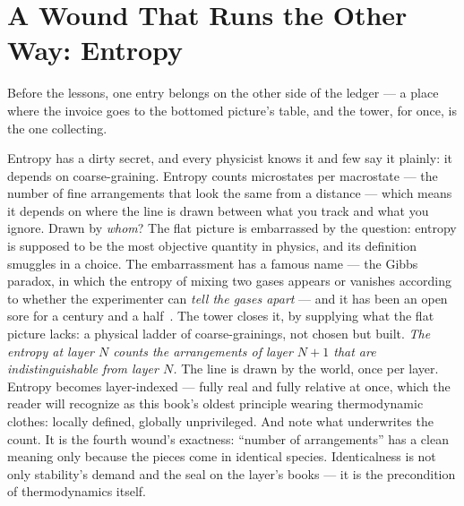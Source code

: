 \documentclass[fontsize=11pt,paper=a4,pagesize=auto,parskip=half-]{scrbook}
\begin{document}
\section{A Wound That Runs the Other Way: Entropy}

Before the lessons, one entry belongs on the other side of the ledger --- a place where the invoice goes to the bottomed picture's table, and the tower, for once, is the one collecting.

Entropy has a dirty secret, and every physicist knows it and few say it plainly: it depends on coarse-graining. Entropy counts microstates per macrostate --- the number of fine arrangements that look the same from a distance --- which means it depends on where the line is drawn between what you track and what you ignore. Drawn by \emph{whom}? The flat picture is embarrassed by the question: entropy is supposed to be the most objective quantity in physics, and its definition smuggles in a choice. The embarrassment has a famous name --- the Gibbs paradox, in which the entropy of mixing two gases appears or vanishes according to whether the experimenter can \emph{tell the gases apart} --- and it has been an open sore for a century and a half~\cite{jaynes1965}. The tower closes it, by supplying what the flat picture lacks: a physical ladder of coarse-grainings, not chosen but built. \emph{The entropy at layer $N$ counts the arrangements of layer $N{+}1$ that are indistinguishable from layer $N$.} The line is drawn by the world, once per layer. Entropy becomes layer-indexed --- fully real and fully relative at once, which the reader will recognize as this book's oldest principle wearing thermodynamic clothes: locally defined, globally unprivileged. And note what underwrites the count. It is the fourth wound's exactness: ``number of arrangements'' has a clean meaning only because the pieces come in identical species. Identicalness is not only stability's demand and the seal on the layer's books --- it is the precondition of thermodynamics itself.
\end{document}
